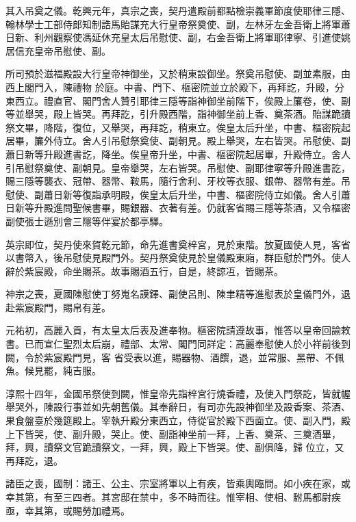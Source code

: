 \begin{pinyinscope}
 其入吊奠之儀。乾興元年，真宗之喪，契丹遣殿前都點檢崇義軍節度使耶律三隱、翰林學士工部侍郎知制誥馬貽謀充大行皇帝祭奠使、副，左林牙左金吾衛上將軍蕭日新、利州觀察使馮延休充皇太后吊慰使、副，右金吾衛上將軍耶律寧、引進使姚居信充皇帝吊慰使、副。



 所司預於滋福殿設大行皇帝神御坐，又於稍東設御坐。祭奠吊慰使、副並素服，由西上閣門入，陳禮物
 於庭。中書、門下、樞密院並立於殿下，再拜訖，升殿，分東西立。禮直官、閣門舍人贊引耶律三隱等詣神御坐前階下，俟殿上簾卷，使、副等並舉哭，殿上皆哭。再拜訖，引升殿西階，詣神御坐前上香、奠茶酒。貽謀跪讀祭文畢，降階，復位，又舉哭，再拜訖，稍東立。俟皇太后升坐，中書、樞密院起居畢，簾外侍立。舍人引吊慰祭奠使、副朝見。殿上舉哭，左右皆哭。吊慰使、副蕭日新等升殿進書訖，降坐。俟皇帝升坐，中書、樞密院起居畢，升殿侍立。舍人
 引吊慰祭奠使、副朝見。皇帝舉哭，左右皆哭。吊慰使、副耶律寧等升殿進書訖，賜三隱等襲衣、冠帶、器幣、鞍馬，隨行舍利、牙校等衣服、銀帶、器幣有差。吊慰使、副蕭日新等復詣承明殿，俟皇太后升坐，中書、樞密院侍立如儀。舍人引蕭日新等升殿進問聖候書畢，賜銀器、衣著有差。仍就客省賜三隱等茶酒，又令樞密副使張士遜別會三隱等伴宴於都亭驛。



 英宗即位，契丹使來賀乾元節，命先進書奠梓宮，見於東階。放夏國使人見，客省
 以書幣入，後吊慰使見殿門外。契丹祭奠使見於皇儀殿東廂，群臣慰於門外。使人辭於紫宸殿，命坐賜茶。故事賜酒五行，自是，終諒冱，皆賜茶。



 神宗之喪，夏國陳慰使丁努嵬名謨鐸、副使呂則、陳聿精等進慰表於皇儀門外，退赴紫宸殿門，賜帛有差。



 元祐初，高麗入貢，有太皇太后表及進奉物。樞密院請遵故事，惟答以皇帝回諭敕書。已而宣仁聖烈太后崩，禮部、太常、閣門同詳定：高麗奉慰使人於小祥前後到闕，令於紫宸殿門見，客
 省受表以進，賜器物、酒饌，退，並常服、黑帶、不佩魚。候見罷，純吉服。



 淳熙十四年，金國吊祭使到闕，惟皇帝先詣梓宮行燒香禮，及使入門祭訖，皆就幄舉哭外，陳設行事並如先朝舊儀。其奉辭日，有司亦先設神御坐及設香案、茶酒、果食盤臺於幾筵殿上。宰執升殿分東西立，侍從官於殿下西面立。使、副入門，殿上下皆哭，使、副升殿，哭止。使、副詣神坐前一拜，上香、奠茶、三奠酒畢，拜，興，讀祭文官跪讀祭文，一拜，興，殿上下皆哭。使、副俱降，歸
 位立，又再拜訖，退。



 諸臣之喪，國制：諸王、公主、宗室將軍以上有疾，皆乘輿臨問。如小疾在家，或幸其第，有至三四者。其宮邸在禁中，多不時而往。惟宰相、使相、駙馬都尉疾亟，幸其第，或賜勞加禮焉。




\end{pinyinscope}
